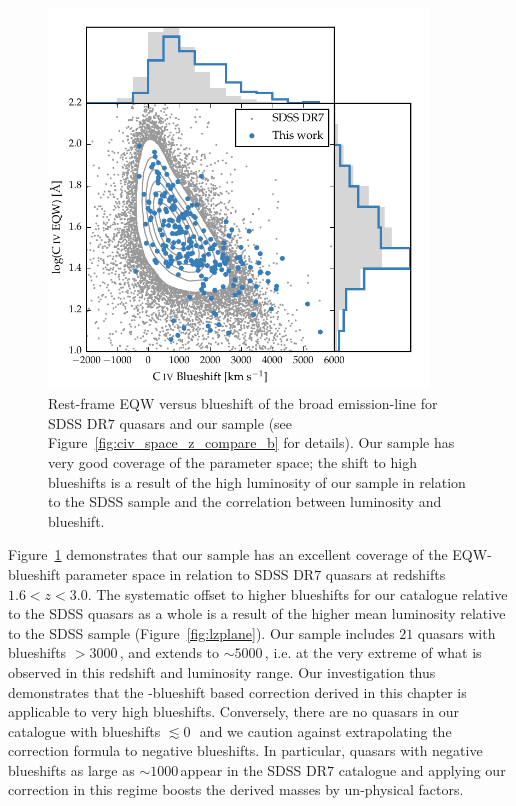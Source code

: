 \begin{figure}
    \centering
    \includegraphics[width=0.9\textwidth]{figures/chapter03/civ_space.pdf} 
    \caption[{Rest-frame EQW versus blueshift of the broad  emission-line for our sample and for $32,157$ SDSS DR$7$ quasars at $1.6 < z < 3.0$}]{Rest-frame EQW versus blueshift of the broad  emission-line for SDSS DR$7$ quasars and our sample (see Figure~\ref{fig:civ_space_z_compare_b} for details). Our sample has very good coverage of the parameter space; the shift to high blueshifts is a result of the high luminosity of our sample in relation to the SDSS sample and the correlation between luminosity and blueshift.} 
    \label{fig:civ_space}
\end{figure}

Figure~\ref{fig:civ_space} demonstrates that our sample has an excellent coverage of the  EQW-blueshift parameter space in relation to SDSS DR$7$ quasars at redshifts $1.6 < z < 3.0$. 
The systematic offset to higher  blueshifts for our catalogue relative to the SDSS quasars as a whole is a result of the higher mean luminosity relative to the SDSS sample (Figure~\ref{fig:lzplane}).
Our sample includes $21$ quasars with  blueshifts $>3000$\,\kms, and extends to $\sim5000$\,\kms, i.e. at the very extreme of what is observed in this redshift and luminosity range. 
Our investigation thus demonstrates that the -blueshift based correction derived in this chapter is applicable to very high blueshifts. 
Conversely, there are no quasars in our catalogue with  blueshifts $\lesssim0$\,\kms\, and we caution against extrapolating the correction formula to negative blueshifts.
In particular, quasars with negative blueshifts as large as $\sim1000$\,\kms appear in the SDSS DR$7$ catalogue and applying our correction in this regime boosts the derived masses by un-physical factors.    


